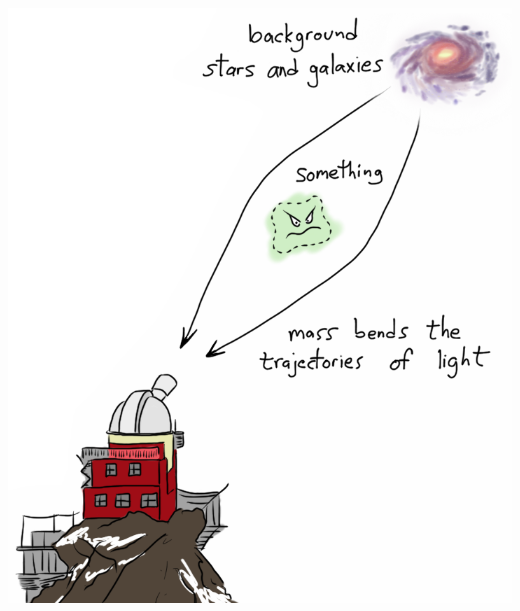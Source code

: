 \documentclass[compress]{beamer}
\begin{document}
\begin{frame}
\begin{columns}
\includegraphics[height=8 cm]{pictures/lensing.png}
\end{columns}
\end{frame}
\end{document}
